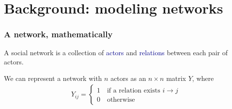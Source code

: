 \documentclass[ 10pt]{beamer}
\begin{document}
\section{Background: modeling networks}
\frame
{
\frametitle{A network, mathematically}

A social network is a collection of \textcolor{darkblue}{actors} and 
\textcolor{darkblue}{relations} between each pair of actors.  
\vspace{1mm}

We can represent a network with $n$ actors as an $n \times n$ matrix $Y$, where
\begin{align*}
	Y_{ij} =
	\begin{cases} 	1 \quad \text{if a relation exists $i \to j$}\\
					0 \quad \text{otherwise}
	\end{cases}
\end{align*}

}
\end{document}
